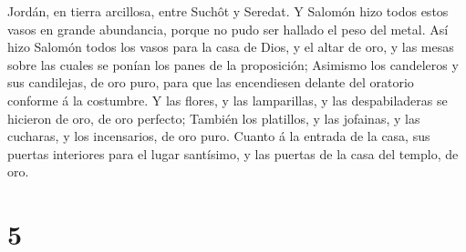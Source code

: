 Jordán, en tierra arcillosa, entre Suchôt y Seredat.  Y
Salomón hizo todos estos vasos en grande abundancia, porque no pudo ser
hallado el peso del metal.  Así hizo Salomón todos los
vasos para la casa de Dios, y el altar de oro, y las mesas sobre las
cuales se ponían los panes de la proposición;  Asimismo los
candeleros y sus candilejas, de oro puro, para que las encendiesen
delante del oratorio conforme á la costumbre.  Y las
flores, y las lamparillas, y las despabiladeras se hicieron de oro, de
oro perfecto;  También los platillos, y las jofainas, y las
cucharas, y los incensarios, de oro puro. Cuanto á la entrada de la
casa, sus puertas interiores para el lugar santísimo, y las puertas de
la casa del templo, de oro.

\hypertarget{section-4}{%
\section{5}\label{section-4}}

